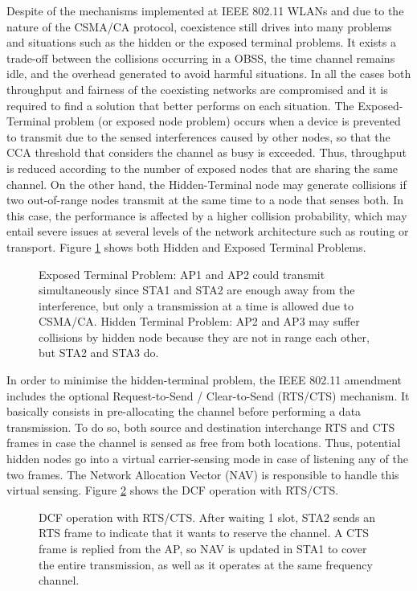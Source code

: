 \documentclass[12pt, a4paper,twoside]{tesi_upf}
\begin{document}
			Despite of the mechanisms implemented at IEEE 802.11 WLANs and due to the nature of the CSMA/CA protocol, coexistence still drives into many problems and situations such as the hidden or the exposed terminal problems. It exists a trade-off between the collisions occurring in a OBSS, the time channel remains idle, and the overhead generated to avoid harmful situations. In all the cases both throughput and fairness of the coexisting networks are compromised and it is required to find a solution that better performs on each situation.	The Exposed-Terminal problem (or exposed node problem) occurs when a device is prevented to transmit due to the sensed interferences caused by other nodes, so that the CCA threshold that considers the channel as busy is exceeded. Thus, throughput is reduced according to the number of exposed nodes that are sharing the same channel. On the other hand, the Hidden-Terminal node may generate collisions if two out-of-range nodes transmit at the same time to a node that senses both. In this case, the performance is affected by a higher collision probability, which may entail severe issues at several levels of the network architecture such as routing or transport. Figure \ref{fig:hidden_exposed} shows both Hidden and Exposed Terminal Problems.					
			\begin{figure}[h!]
				\centering
				\caption{Exposed Terminal Problem: AP1 and AP2 could transmit simultaneously since STA1 and STA2 are enough away from the interference, but only a transmission at a time is allowed due to CSMA/CA. Hidden Terminal Problem: AP2 and AP3 may suffer collisions by hidden node because they are not in range each other, but STA2 and STA3 do.}
				\label{fig:hidden_exposed}
			\end{figure}		
			
			In order to minimise the hidden-terminal problem, the IEEE 802.11 amendment includes the optional Request-to-Send / Clear-to-Send (RTS/CTS) mechanism. It basically consists in pre-allocating the channel before performing a data transmission. To do so, both source and destination interchange RTS and CTS frames in case the channel is sensed as free from both locations. Thus, potential hidden nodes go into a virtual carrier-sensing mode in case of listening any of the two frames. The Network Allocation Vector (NAV) is responsible to handle this virtual sensing. Figure \ref{fig:dcf_operation} shows the DCF operation with RTS/CTS.					
			\begin{figure}[h!]
				\centering
				\caption{DCF operation with RTS/CTS. After waiting 1 slot, STA2 sends an RTS frame to indicate that it wants to reserve the channel. A CTS frame is replied from the AP, so NAV is updated in STA1 to cover the entire transmission, as well as it operates at the same frequency channel.}
				\label{fig:dcf_operation}
			\end{figure}
		
\end{document}

